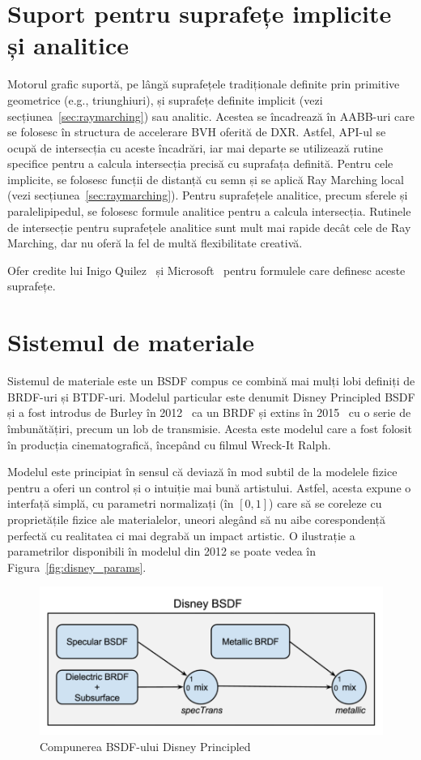 \documentclass[12pt,a4paper]{report}
\numberwithin{equation}{section} %
\begin{document}
\section{Suport pentru suprafețe implicite și analitice}
Motorul grafic suportă, pe lângă suprafețele tradiționale definite prin primitive
geometrice (e.g., triunghiuri), și suprafețe definite implicit (vezi secțiunea~\ref{sec:raymarching}) sau analitic.
Acestea se încadrează în AABB-uri care se folosesc în structura de accelerare BVH
oferită de DXR. Astfel, API-ul se ocupă de intersecția cu aceste încadrări, iar
mai departe se utilizează rutine specifice pentru a calcula intersecția precisă
cu suprafața definită. Pentru cele implicite, se folosesc funcții de distanță cu semn
și se aplică Ray Marching local (vezi secțiunea~\ref{sec:raymarching}). Pentru
suprafețele analitice, precum sferele și paralelipipedul, se folosesc formule
analitice pentru a calcula intersecția. Rutinele de intersecție pentru suprafețele
analitice sunt mult mai rapide decât cele de Ray Marching, dar nu oferă la fel
de multă flexibilitate creativă.

Ofer credite lui Inigo Quilez~\cite{iq} și Microsoft~\cite{Schelet} pentru formulele care definesc aceste
suprafețe.

\section{Sistemul de materiale}\label{sec:disney}

Sistemul de materiale este un BSDF compus ce combină mai mulți lobi definiți
de BRDF-uri și BTDF-uri. Modelul particular este denumit Disney Principled BSDF
și a fost introdus de Burley în 2012~\cite{Disney} ca un BRDF și extins în 2015~\cite{DisneyBSDF}
cu o serie de îmbunătățiri, precum un lob de transmisie. Acesta este modelul care
a fost folosit în producția cinematografică, începând cu filmul Wreck-It Ralph.

Modelul este principiat în sensul că deviază în mod subtil de la modelele fizice
pentru a oferi un control și o intuiție mai bună artistului. Astfel, acesta expune
o interfață simplă, cu parametri normalizați (în $[0, 1]$) care să se coreleze
cu proprietățile fizice ale materialelor, uneori alegând să nu aibe corespondență perfectă
cu realitatea ci mai degrabă un impact artistic. O ilustrație a parametrilor
disponibili în modelul din 2012 se poate vedea în Figura~\ref{fig:disney_params}.
\begin{figure}[!htb]
	\centering
	\includegraphics[width=\textwidth]{pics/disneybsdf.png}
	\caption{Compunerea BSDF-ului Disney Principled~\cite{DisneyBSDF}}
	\label{fig:disneybsdf}
\end{figure}
\end{document}
